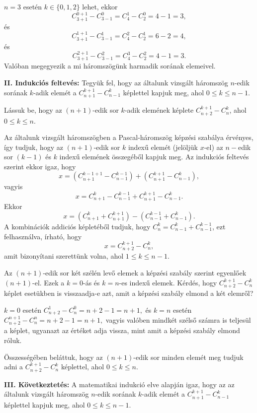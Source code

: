 \begin{solution}
$n=3$ esetén $k\in\{0,1,2\}$ lehet, ekkor 
\[
C_{3+1}^{0+1}-C_{3-1}^{0}=C_{4}^{1}-C_{2}^{0}=4-1=3,
\]
és 
\[
C_{3+1}^{1+1}-C_{3-1}^{1}=C_{4}^{2}-C_{2}^{1}=6-2=4,
\]
és 
\[
C_{3+1}^{2+1}-C_{3-1}^{2}=C_{4}^{3}-C_{2}^{2}=4-1=3.
\]
Valóban megegyezik a mi háromszögünk harmadik sorának elemeivel.

\vspace{0.15cm}

\textbf{II. Indukciós feltevés:} Tegyük fel, hogy az általunk vizsgált
háromszög $n$-edik sorának $k$-adik elemét a $C_{n+1}^{k+1}-C_{n-1}^{k}$
képlettel kapjuk meg, ahol $0\leq k\leq n-1$.

Lássuk be, hogy az $(n+1)$-edik sor $k$-adik elemének képlete $C_{n+2}^{k+1}-C_{n}^{k}$,
ahol $0\leq k\leq n$.

Az általunk vizsgált háromszögben a Pascal-háromszög képzési szabálya
érvényes, így tudjuk, hogy az $(n+1)$-edik sor $k$ indexű elemét
(jelöljük $x$-el) az $n-$edik sor $(k-1)$ és $k$ indexű elemének
összegéből kapjuk meg. Az indukciós feltevés szerint ekkor igaz, hogy
\[
x=(C_{n+1}^{k-1+1}-C_{n-1}^{k-1})+(C_{n+1}^{k+1}-C_{n-1}^{k}),
\]
vagyis 
\[
x=C_{n+1}^{k}-C_{n-1}^{k-1}+C_{n+1}^{k+1}-C_{n-1}^{k}.
\]
Ekkor 
\[
x=(C_{n+1}^{k}+C_{n+1}^{k+1})-(C_{n-1}^{k-1}+C_{n-1}^{k}).
\]
A kombinációk addiciós képletéből tudjuk, hogy $C_{n}^{k}=C_{n-1}^{k}+C_{n-1}^{k-1}$,
ezt felhasználva, írható, hogy 
\[
x=C_{n+2}^{k+1}-C_{n}^{k},
\]
amit bizonyítani szerettünk volna, ahol $1\leq k\leq n-1.$

Az $(n+1)$-edik sor két szélén levő elemek a képzési szabály szerint
egyenlőek $(n+1)$-el. Ezek a $k=0$-ás és $k=n$-es indexű elemek.
Kérdés, hogy $C_{n+2}^{k+1}-C_{n}^{k}$ képlet esetükben is visszaadja-e
azt, amit a képzési szabály elmond a két elemről?

$k=0$ esetén $C_{n+2}^{1}-C_{n}^{0}=n+2-1=n+1,$ és $k=n$ esetén
$C_{n+2}^{n+1}-C_{n}^{n}=n+2-1=n+1,$ vagyis valóben mindkét szélső
számra is teljesül a képlet, ugyanazt az értéket adja vissza, mint
amit a képzési szabály elmond róluk.

Összességében beláttuk, hogy az $(n+1)$-edik sor minden elemét meg
tudjuk adni a $C_{n+2}^{k+1}-C_{n}^{k}$ képlettel, ahol $0\leq k\leq n$.

\vspace{0.15cm}

\textbf{III. Következtetés:} A matematikai indukció elve alapján igaz,
hogy az az általunk vizsgált háromszög $n$-edik sorának $k$-adik
elemét a $C_{n+1}^{k+1}-C_{n-1}^{k}$ képlettel kapjuk meg, ahol $0\leq k\leq n-1$. 
\end{solution}


